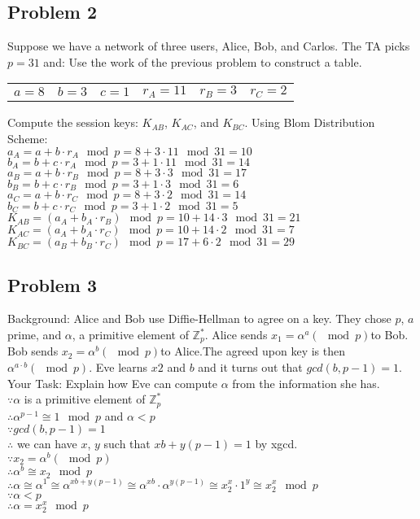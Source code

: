 \documentclass[paper=a4, fontsize=11pt]{scrartcl} %
\numberwithin{equation}{section} %
\numberwithin{figure}{section} %
\newcommand{\problem}[1]{\subsection *{Problem #1}}
\newcommand{\Z}{\mathbb{Z}}
\begin{document}
\problem 2
Suppose we have a network of three users, Alice, Bob, and Carlos. The TA picks $p = 31$ and:
Use the work of the previous problem to construct a table.\\
\begin{tabular}{ c c c c c c}
  $a=8$ & $b=3$ & $c=1$ & $r_A=11$ & $r_B=3$ & $r_C=2$\\
\end{tabular}

Compute the session keys: $K_{AB}$, $K_{AC}$, and $K_{BC}$.
Using Blom Distribution Scheme:\\
$a_A = a+b\cdot r_A \mod p= 8+3\cdot 11 \mod 31 = 10 $\\
$b_A = b+c\cdot r_A \mod p= 3+1\cdot 11 \mod 31 = 14 $\\
$a_B = a+b\cdot r_B \mod p= 8+3\cdot 3 \mod 31 = 17 $\\
$b_B = b+c\cdot r_B \mod p= 3+1\cdot 3 \mod 31 = 6 $\\
$a_C = a+b\cdot r_C \mod p= 8+3\cdot 2 \mod 31 = 14 $\\
$b_C = b+c\cdot r_C \mod p= 3+1\cdot 2 \mod 31 = 5 $\\
$K_{AB}=(a_A+b_A\cdot r_B) \mod p=10 + 14 \cdot 3 \mod 31= 21$\\
$K_{AC}=(a_A+b_A\cdot r_C) \mod p=10 + 14 \cdot 2 \mod 31= 7$\\
$K_{BC}=(a_B+b_B\cdot r_C) \mod p=17 + 6 \cdot 2 \mod 31 = 29$\\

\problem 3
Background: Alice and Bob use Diffie-Hellman to agree on a key. They chose $p$, $a$ prime, and $\alpha$, a primitive element of $\Z^*_p$. Alice sends $x_1 =\alpha^a (\mod p)$to Bob. Bob sends $x_2 =\alpha^b (\mod p)$to Alice.The agreed upon key is then $\alpha^{a\cdot b} (\mod p)$. Eve learns $x2$ and $b$ and it turns out that $gcd(b, p - 1) = 1$.\\
Your Task: Explain how Eve can compute $\alpha$ from the information she has.\\
$\because \alpha$ is a primitive element of $\Z^*_p$\\
$\therefore \alpha^{p-1} \cong 1 \mod p$ and $\alpha < p$\\
$\because gcd(b, p - 1) = 1$\\
$\therefore $ we can have $x$, $y$ such that $xb+y(p-1)=1$ by xgcd.\\
$\because x_2 =\alpha^b (\mod p)$\\
$\therefore \alpha^b \cong x_2 \mod p$\\
$\therefore \alpha \cong \alpha^1 \cong \alpha^{xb+y(p-1)} \cong \alpha^{xb} \cdot \alpha^{y(p-1)} \cong x_2^x \cdot 1^y \cong x_2^x \mod p$ \\
$\because \alpha < p$\\
$\therefore \alpha = x_2^x \mod p$
\end{document}
